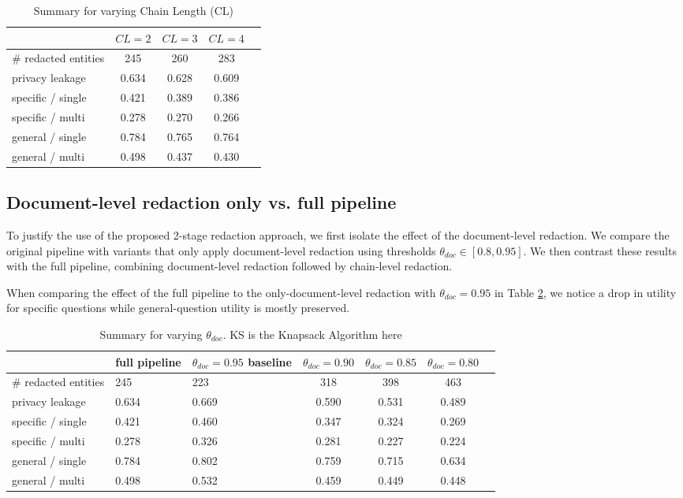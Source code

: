 \begin{table}[h!]
\centering
\caption{Summary for varying Chain Length (CL)}
\label{discussion-tab:chain_length}
\begin{tabular}{l c c c c}
\toprule
\textbf{ } & $CL = 2$ & $CL = 3$ & $CL = 4$ \\
\midrule
\# redacted entities & 245 & 260 & 283 \\
\midrule
privacy leakage & 0.634 &0.628 &0.609  \\
\midrule
specific / single & 0.421 & 0.389 & 0.386 \\
specific / multi & 0.278 & 0.270 & 0.266 \\
general / single & 0.784 & 0.765 & 0.764 \\
general / multi & 0.498 & 0.437 & 0.430 \\
\bottomrule
\end{tabular}
\end{table}


\subsection{Document-level redaction only vs. full pipeline}
To justify the use of the proposed 2-stage redaction approach, we first isolate the effect of the document-level redaction. We compare the original pipeline with variants that only apply document-level redaction using thresholds $\theta_{doc}\in[0.8, 0.95]$. We then contrast these results with the full pipeline, combining document-level redaction followed by chain-level redaction. 

When comparing the effect of the full pipeline to the only-document-level redaction with $\theta_{doc} = 0.95$ in Table \ref{discussion-tab:theta_doc_llm}, we notice a drop in utility for specific questions while general-question utility is mostly preserved. 

\begin{table}[h!]
\centering
\caption{Summary for varying $\theta_{doc}$. KS is the Knapsack Algorithm here}
\label{discussion-tab:theta_doc_llm}
\begin{tabular}{l p{1.5cm} p{2cm} c c c c}
\toprule
\textbf{ } & \textbf{full pipeline} & $\theta_{doc} = 0.95$ {baseline}& $\theta_{doc} = 0.90$ &  $\theta_{doc} = 0.85$ & $\theta_{doc} = 0.80$\\
\midrule
\# redacted entities & 245 & 223 & 318 & 398 & 463  \\
\midrule
privacy leakage & 0.634 &0.669 &0.590 &0.531 &0.489  \\
\midrule
specific / single & 0.421 & 0.460 & 0.347 & 0.324 & 0.269 \\
specific / multi & 0.278 & 0.326 & 0.281 & 0.227 & 0.224  \\
general / single & 0.784 & 0.802 & 0.759 & 0.715 & 0.634  \\
general / multi & 0.498 & 0.532 & 0.459 & 0.449 & 0.448  \\

\bottomrule
\end{tabular}
\end{table}


